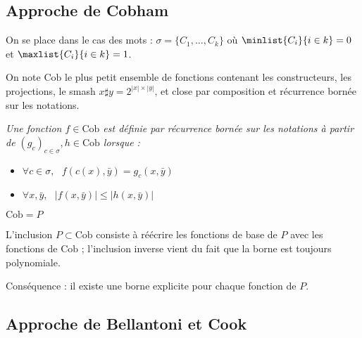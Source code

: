 \documentclass{report}
\begin{document}
		
		\subsection{Approche de Cobham}
		\label{sec:Cobham}
		
			On se place dans le cas des mots : $\sigma = \{ C_1, \dots, C_k \}$ où $\minlist{C_i}{i \in k} = 0$ et $\maxlist{C_i}{i \in k} = 1$.
			
			
			\begin{definition}
				\label{def:Cob}
				On note $\text{Cob}$ le plus petit ensemble de fonctions contenant les constructeurs, les projections, le smash $x \sharp y = 2^{\left| x \right| \times \left| y\right|}$, et close par composition et récurrence bornée sur les notations.
				
				\hspace{0.05\linewidth}\parbox{0.9\linewidth}{
					\small
					\emph{Une fonction $f \in \text{Cob}$ est définie par récurrence bornée sur les notations à partir de $(g_c)_{c \in \sigma}, h \in \text{Cob}$ lorsque :}
					
					\begin{itemize}[itemsep=-1mm]
						\item 	$\forall c \in \sigma, \:\:\: f\left( c(x), \bar{y} \right) = g_c\left( x, \bar{y} \right)$
						\item 	$\forall x, \bar{y}, \:\:\: \left| f \left( x, \bar{y} \right) \right| \leq \left| h \left( x, \bar{y} \right) \right|$
					\end{itemize}
				}
				
			\end{definition}
			
			
			\begin{theorem}[Cobham]
				\label{thm:Cob_equals_P}
				$\text{Cob} = P$
			\end{theorem}
		
			L'inclusion $P \subset \text{Cob}$  consiste à réécrire les fonctions de base de $P$ avec les fonctions de $\text{Cob}$ ; l'inclusion inverse vient du fait que la borne est toujours polynomiale.
			
			Conséquence : il existe une borne explicite pour chaque fonction de $P$. 
		
		
		
		\subsection{Approche de Bellantoni et Cook}
			\label{subsec:bellantoni_cook}
		
\end{document}
